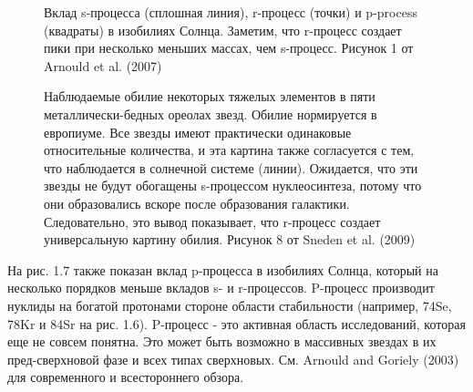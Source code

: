 \documentclass[%
bachelor,    %
natbib,      %
subf,        %
href,        %
colorlinks,  %
]{disser}
\begin{document}
\begin{figure}[h]
	\caption{Вклад s-процесса (сплошная линия), r-процесс (точки) и p-process (квадраты) в изобилиях Солнца. Заметим, что r-процесс создает пики при несколько меньших массах, чем s-процесс. Рисунок 1 от Arnould et al. (2007)}\label{ris:7}
\end{figure}

\begin{figure}[h]
	\caption{Наблюдаемые обилие некоторых тяжелых элементов в пяти металлически-бедных ореолах
		звезд. Обилие нормируется в европиуме. Все звезды имеют практически одинаковые относительные количества, и эта картина также согласуется с тем, что наблюдается в		солнечной системе (линии). Ожидается, что эти звезды не будут обогащены s-процессом нуклеосинтеза, потому что они образовались вскоре после образования галактики. Следовательно, это вывод показывает, что r-процесс создает универсальную картину обилия. Рисунок	8 от Sneden et al. (2009)}
	\label{ris:8}
\end{figure}

На рис. 1.7 также показан вклад p-процесса в изобилиях Солнца, который на несколько порядков меньше вкладов s- и r-процессов. P-процесс производит нуклиды на богатой протонами стороне области стабильности (например, 74Se, 78Kr и 84Sr на рис. 1.6). P-процесс - это активная область исследований, которая еще не совсем понятна. Это может быть возможно в массивных звездах в их пред-сверхновой фазе и всех типах сверхновых. См. Arnould and Goriely (2003) для современного и всестороннего обзора.
\end{document}

